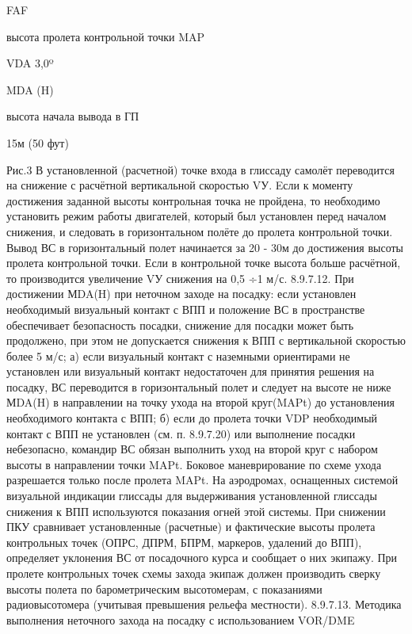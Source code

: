             FAF


высота пролета контрольной точки                                                           MAP

                                                             VDA 3,0º



MDA (H)

                                   высота начала вывода в ГП

	15м (50 фут)
  
Рис.3
В установленной (расчетной) точке входа в глиссаду самолёт переводится на снижение с расчётной вертикальной скоростью VУ.
Eсли к моменту достижения заданной высоты контрольная точка не пройдена, то необходимо установить режим работы двигателей, который был установлен перед началом снижения, и следовать в горизонтальном полёте до пролета контрольной точки.
Вывод ВС в горизонтальный полет начинается за 20 - 30м до достижения высоты пролета контрольной точки.
Если в контрольной точке высота больше расчётной, то производится увеличение VУ снижения на 0,5 ÷1 м/с.
8.9.7.12.	При достижении МDA(H) при неточном заходе на посадку:
если установлен необходимый визуальный контакт с ВПП и положение ВС в пространстве обеспечивает безопасность посадки, снижение для посадки может быть продолжено, при этом не допускается снижения к ВПП с вертикальной скоростью более 5 м/с;
а)	если визуальный контакт с наземными ориентирами не установлен или визуальный контакт недостаточен для принятия решения на посадку, ВС переводится в горизонтальный полет и следует на высоте не ниже МDA(H) в направлении на точку ухода на второй круг(MAPt) до установления необходимого контакта с ВПП;
б)	если до пролета точки VDP необходимый контакт с ВПП не установлен (см. п. 8.9.7.20) или выполнение посадки небезопасно, командир ВС обязан выполнить уход на второй круг с набором высоты в направлении точки MAPt. Боковое маневрирование по схеме ухода разрешается только после пролета MAPt.
На аэродромах, оснащенных системой визуальной индикации глиссады для выдерживания установленной глиссады снижения к ВПП используются показания огней этой системы.
При снижении ПКУ сравнивает установленные (расчетные) и фактические высоты пролета контрольных точек (ОПРС, ДПРМ, БПРМ, маркеров, удалений до ВПП), определяет уклонения ВС от посадочного курса и сообщает о них экипажу.
При пролете контрольных точек схемы захода экипаж должен производить сверку высоты полета по барометрическим высотомерам, с показаниями радиовысотомера (учитывая превышения рельефа местности).
8.9.7.13.	Методика выполнения неточного захода на посадку с использованием VOR/DME
